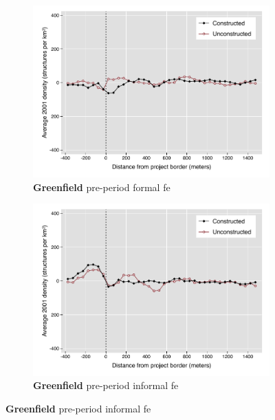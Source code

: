 \documentclass[12pt]{article}
\begin{document}
\begin{figure}
\begin{subfigure}[b]{0.48\textwidth}
        \end{subfigure}
        \begin{subfigure}[b]{0.48\textwidth}
                    \caption[Network2]%
            {{\footnotesize \textbf{Greenfield} pre-period formal  fe }}    
            \label{fig:prefor}
            \centering
            \includegraphics[width=\textwidth,trim={0.3cm .3cm 0.1cm 0cm}, clip=true]{figures/bblu_for_fe_pre_means_4_1_sp_postk.pdf}

        \end{subfigure}
        \hfill
        \begin{subfigure}[b]{0.48\textwidth}  
                    \caption[]%
            {{\footnotesize \textbf{Greenfield} pre-period informal fe }}     
            \label{fig:preinf}
            \centering 
            \includegraphics[width=\textwidth,trim={0.3cm .3cm 0.1cm 0cm}, clip=true]{figures/bblu_inf_fe_pre_means_4_1_sp_postk.pdf}


\end{subfigure}
\end{figure}
\end{document}
